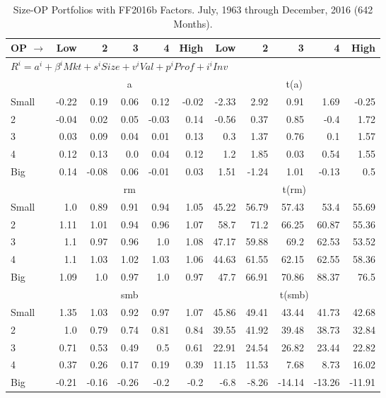 
\begin{table}[!ht]
\centering
\caption{Size-OP Portfolios with FF2016b Factors. \footnotesize{July, 1963 through December, 2016 (642 Months).}}
\begin{tabular}{lrrrrrrrrrr}
  \toprule
  OP $\rightarrow$ & Low & 2 & 3 & 4 & High & Low & 2 & 3 & 4 & High \\ 
  \toprule
  \multicolumn{9}{l}{$R^i=a^i+\beta^iMkt+s^iSize+v^iVal+p^iProf+i^iInv$} \\

  

      & \multicolumn{5}{c}{a} & \multicolumn{5}{c}{t(a)} \\
    \cmidrule(r){2-6} \cmidrule(r){7-11}
      Small  & -0.22  & 0.19  & 0.06  & 0.12  & -0.02   & -2.33  & 2.92  & 0.91  & 1.69  & -0.25  \\
          2  & -0.04  & 0.02  & 0.05  & -0.03  & 0.14   & -0.56  & 0.37  & 0.85  & -0.4  & 1.72  \\
          3  & 0.03  & 0.09  & 0.04  & 0.01  & 0.13   & 0.3  & 1.37  & 0.76  & 0.1  & 1.57  \\
          4  & 0.12  & 0.13  & 0.0  & 0.04  & 0.12   & 1.2  & 1.85  & 0.03  & 0.54  & 1.55  \\
      Big    & 0.14  & -0.08  & 0.06  & -0.01  & 0.03   & 1.51  & -1.24  & 1.01  & -0.13  & 0.5  \\

  

      & \multicolumn{5}{c}{rm} & \multicolumn{5}{c}{t(rm)} \\
    \cmidrule(r){2-6} \cmidrule(r){7-11}
      Small  & 1.0  & 0.89  & 0.91  & 0.94  & 1.05   & 45.22  & 56.79  & 57.43  & 53.4  & 55.69  \\
          2  & 1.11  & 1.01  & 0.94  & 0.96  & 1.07   & 58.7  & 71.2  & 66.25  & 60.87  & 55.36  \\
          3  & 1.1  & 0.97  & 0.96  & 1.0  & 1.08   & 47.17  & 59.88  & 69.2  & 62.53  & 53.52  \\
          4  & 1.1  & 1.03  & 1.02  & 1.03  & 1.06   & 44.63  & 61.55  & 62.15  & 62.55  & 58.36  \\
      Big    & 1.09  & 1.0  & 0.97  & 1.0  & 0.97   & 47.7  & 66.91  & 70.86  & 88.37  & 76.5  \\

  

      & \multicolumn{5}{c}{smb} & \multicolumn{5}{c}{t(smb)} \\
    \cmidrule(r){2-6} \cmidrule(r){7-11}
      Small  & 1.35  & 1.03  & 0.92  & 0.97  & 1.07   & 45.86  & 49.41  & 43.44  & 41.73  & 42.68  \\
          2  & 1.0  & 0.79  & 0.74  & 0.81  & 0.84   & 39.55  & 41.92  & 39.48  & 38.73  & 32.84  \\
          3  & 0.71  & 0.53  & 0.49  & 0.5  & 0.61   & 22.91  & 24.54  & 26.82  & 23.44  & 22.82  \\
          4  & 0.37  & 0.26  & 0.17  & 0.19  & 0.39   & 11.15  & 11.53  & 7.68  & 8.73  & 16.02  \\
      Big    & -0.21  & -0.16  & -0.26  & -0.2  & -0.2   & -6.8  & -8.26  & -14.14  & -13.26  & -11.91  \\


\end{tabular}
\end{table}
